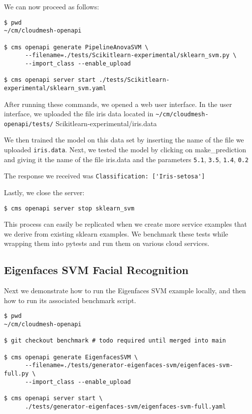 We can now proceed as follows:

\begin{verbatim}
$ pwd
~/cm/cloudmesh-openapi

$ cms openapi generate PipelineAnovaSVM \
      --filename=./tests/Scikitlearn-experimental/sklearn_svm.py \
      --import_class --enable_upload

$ cms openapi server start ./tests/Scikitlearn-experimental/sklearn_svm.yaml
\end{verbatim}

After running these commands, we opened a web user interface. In the
user interface, we uploaded the file iris data located in
\verb|~/cm/cloudmesh-openapi/tests/|
Scikitlearn-experimental/iris.data

We then trained the model on this data set by inserting the name of the
file we uploaded \verb|iris.data|. Next, we tested the model by
clicking on make\_prediction and giving it the name of the file
iris.data and the parameters \verb|5.1|, \verb|3.5|, \verb|1.4|,
\verb|0.2|

The response we received was
\verb|Classification: ['Iris-setosa']|

Lastly, we close the server:

\begin{verbatim}
$ cms openapi server stop sklearn_svm
\end{verbatim}

This process can easily be replicated when we create more service
examples that we derive from existing sklearn examples. We benchmark
these tests while wrapping them into pytests and run them on various
cloud services.

\subsection{Eigenfaces SVM Facial
Recognition}\label{a.3.-eigenfaces-svm-facial-recognition}

Next we demonstrate how to run the Eigenfaces SVM example locally, and
then how to run its associated benchmark script.

\begin{verbatim}
$ pwd
~/cm/cloudmesh-openapi

$ git checkout benchmark # todo required until merged into main

$ cms openapi generate EigenfacesSVM \
      --filename=./tests/generator-eigenfaces-svm/eigenfaces-svm-full.py \
      --import_class --enable_upload

$ cms openapi server start \
      ./tests/generator-eigenfaces-svm/eigenfaces-svm-full.yaml
\end{verbatim}

